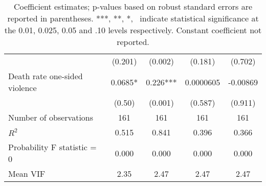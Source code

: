 \begin{table}[!htb]
\begin{tabular}{lcccc}
                              & (0.201)         & (0.002)          & (0.181)            & (0.702) \\
Death rate one-sided violence & 0.0685*         & 0.226***         & 0.0000605          & -0.00869 \\
                              & (0.50)          & (0.001)          & (0.587)            & (0.911) \\
\midrule
Number of observations        & 161             & 161              & 161                & 161 \\
$R^2$                         & 0.515           & 0.841            & 0.396              & 0.366 \\
Probability F statistic = 0   & 0.000           & 0.000            & 0.000              & 0.000 \\
Mean VIF                      & 2.35            & 2.47             & 2.47               & 2.47 \\
\bottomrule
\end{tabular}
\caption*{\footnotesize Coefficient estimates; p-values based on robust standard errors are reported in parentheses.
***, **, *, \dag \ indicate statistical significance at the 0.01, 0.025, 0.05 and .10 levels respectively.
Constant coefficient not reported.}
\end{table}
